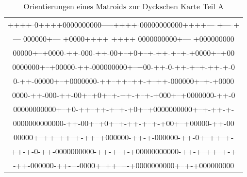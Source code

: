 \begin{table}
{\begin{center}
\begin{tabular}{c}
++++-0++++0000000000-----++++-00000000000++++----+----+\\
----000000+----+0000++++-++++-0000000000+----+000000000\\[2mm]
00000+--+0000-++-000-++-00+--+0+--+-++-+--+-+0000+--+00\\
0000000+--+00000-++-000000000+--+00-++-0-++-+--+-++-+-0\\
0-++-00000+--+0000000-++--++--++-+--++-000000+--+-+0000\\
0000-++-000-++-00+--+0+--+-++-+--+-+000+--+0000000-++-0\\
00000000000+--+0-++--++-+--+-+0+--+0000000000+--+-++-+-\\
0000000000000-++-00+--+0+--+-++-+--+-+00+--+00000-++-00\\
00000+--++--++--+-++--+000000-++-+-000000-++-0+--++--+-\\
++-+-0-++-0000000000-++-+--+-+00000000000-++-+--++--+-+\\
-++-000000-++-+-0000+--++--+-+0000000000+--+-+000000000
\end{tabular}
\end{center}
}
\caption{\label{dyckori2A}Orientierungen eines Matroids zur Dyckschen Karte
         Teil A}
\end{table}

